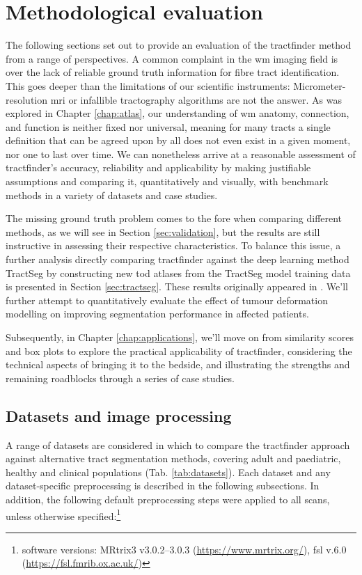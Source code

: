 \chapter{Methodological evaluation}\label{chap:eval}

The following sections set out to provide an evaluation of the tractfinder method from a range of perspectives.
A common complaint in the \gls{wm} imaging field is over the lack of reliable ground truth information for fibre tract identification.
This goes deeper than the limitations of our scientific instruments:
Micrometer-resolution \gls{mri} or infallible tractography algorithms are not the answer.
As was explored in Chapter \ref{chap:atlas}, our understanding of \gls{wm} anatomy, connection, and function is neither fixed nor universal, meaning for many tracts a single definition that can be agreed upon by all does not even exist in a given moment, nor one to last over time.
We can nonetheless arrive at a reasonable assessment of tractfinder's accuracy, reliability and applicability by making justifiable assumptions and comparing it, quantitatively and visually, with benchmark methods in a variety of datasets and case studies.

The missing ground truth problem comes to the fore when comparing different methods, as we will see in Section \ref{sec:validation}, but the results are still instructive in assessing their respective characteristics.
To balance this issue, a further analysis directly comparing tractfinder against the deep learning method TractSeg by constructing new \gls{tod} atlases from the TractSeg model training data is presented in Section \ref{sec:tractseg}.
These results originally appeared in \textcite{Young2024}.
We'll further attempt to quantitatively evaluate the effect of tumour deformation modelling on improving segmentation performance in affected patients.

Subsequently, in Chapter \ref{chap:applications}, we'll move on from similarity scores and box plots to explore the practical applicability of tractfinder, considering the technical aspects of bringing it to the bedside, and illustrating the strengths and remaining roadblocks through a series of case studies.

\section{Datasets and image processing}
\label{sec:data}

A range of datasets are considered in which to compare the tractfinder approach against alternative tract segmentation methods, covering adult and paediatric, healthy and clinical populations (Tab. \ref{tab:datasets}).
Each dataset and any dataset-specific preprocessing is described in the following subsections.
In addition, the following default preprocessing steps were applied to all scans, unless otherwise specified:\footnote[2]{software versions: MRtrix3 v3.0.2--3.0.3 (\url{https://www.mrtrix.org/}), \gls{fsl} v.6.0 (\url{https://fsl.fmrib.ox.ac.uk/})}

